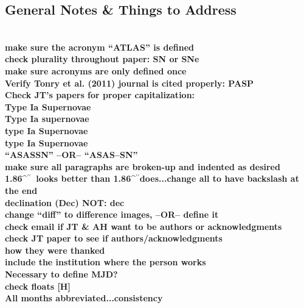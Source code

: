 \documentclass[aps,prb,twocolumn,superscriptaddress]{revtex4-1}
\def\arcsec{\ifmmode^{\prime\prime}\else$^{\prime\prime}$\fi}
\begin{document}
\clearpage
\begin{widetext} %
 \section{General Notes \& Things to Address}
 \\
 {\bf make sure the acronym ``ATLAS'' is defined\\}
 {\bf check plurality throughout paper: SN or SNe\\}
 {\bf make sure acronyms are only defined once\\}
 {\bf Verify Tonry et al. (2011) journal is cited properly: PASP\\}
 {\bf Check JT's papers for proper capitalization:\\
 \indent Type Ia Supernovae\\
 \indent Type Ia supernovae\\
 \indent type Ia Supernovae\\
 \indent type Ia Supernovae\\}
 {\bf ``ASASSN'' --OR-- ``ASAS--SN''\\}
 {\bf make sure all paragraphs are broken-up and indented as desired\\}
 {\bf 1.86\arcsec\ looks better than 1.86\arcsec does...change all to have backslash at the end}\\
 {\bf declination (Dec) NOT: dec}\\
 {\bf change ``diff'' to difference images, --OR-- define it}\\ 
 {\bf check email if JT \& AH want to be authors or acknowledgments}\\
 {\bf check JT paper to see if authors/acknowledgments \\
 \indent how they were thanked\\
 \indent include the institution where the person works}\\
 {\bf Necessary to define MJD?}\\
 {\bf check floats [H]}\\
 {\bf All months abbreviated...consistency}
\end{widetext}
\end{document}
